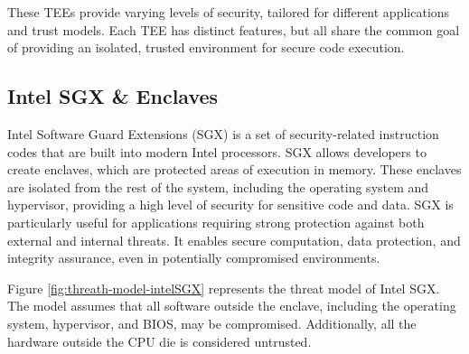 These TEEs provide varying levels of security, tailored for different applications and trust models. Each TEE has distinct features, but all share the common goal of providing an isolated, trusted environment for secure code execution.

\subsection{Intel SGX \& Enclaves}
Intel Software Guard Extensions (SGX) is a set of security-related instruction codes that are built into modern Intel processors. SGX allows developers to create enclaves, which are protected areas of execution in memory. These enclaves are isolated from the rest of the system, including the operating system and hypervisor, providing a high level of security for sensitive code and data. SGX is particularly useful for applications requiring strong protection against both external and internal threats. It enables secure computation, data protection, and integrity assurance, even in potentially compromised environments.

Figure \ref{fig:threath-model-intelSGX} represents the threat model of Intel SGX. The model assumes that all software outside the enclave, including the operating system, hypervisor, and BIOS, may be compromised. Additionally, all the hardware outside the CPU die is considered untrusted.

